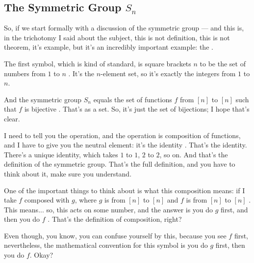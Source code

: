 \begin{hidden}
\end{hidden}

\subsection{The Symmetric Group \texorpdfstring{$S_n$}{S\_n}}

\begin{speech}[01:01:35 - 01:03:34]
So, if we start formally with a discussion of the symmetric group --- and this is, in the trichotomy I said about the subject, this is not definition, this is not theorem, it's example, but it's an incredibly important example: the  .

The first symbol, which is kind of standard, is square brackets $n$ to be the set of numbers from $1$ to $n$ . It's the $n$-element set, so it's exactly the integers from $1$ to $n$.

And the symmetric group $S_n$ equals the set of functions $f$ from $[n]$ to $[n]$ such that $f$ is bijective . That's as a set. So, it's just the set of bijections; I hope that's clear.

I need to tell you the operation, and the operation is composition of functions, and I have to give you the neutral element: it's the identity . That's the identity. There's a unique identity, which takes $1$ to $1$, $2$ to $2$, so on. And that's the definition of the symmetric group. That's the full definition, and you have to think about it, make sure you understand.

One of the important things to think about is what this composition means: if I take $f$ composed with $g$, where $g$ is from $[n]$ to $[n]$ and $f$ is from $[n]$ to $[n]$ . This means... so, this acts on some number, and the answer is you do $g$ first, and then you do $f$ . That's the definition of composition, right?

Even though, you know, you can confuse yourself by this, because you see $f$ first, nevertheless, the mathematical convention for this symbol  is you do $g$ first, then you do $f$. Okay?
\end{speech}

